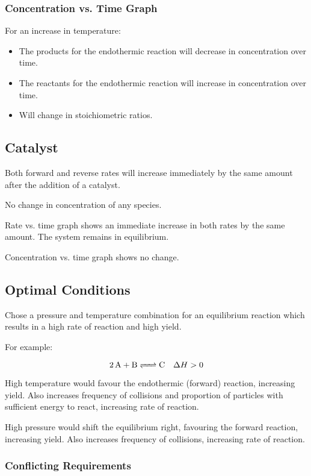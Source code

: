 \documentclass[a4paper,11pt]{article}
\begin{document}
\subsubsection{Concentration vs. Time Graph}

For an increase in temperature:

\begin{itemize}
\item The products for the endothermic reaction will decrease in concentration
	over time.
\item The reactants for the endothermic reaction will increase in concentration
	over time.
\item Will change in stoichiometric ratios.
\end{itemize}


\subsection{Catalyst}

Both forward and reverse rates will increase immediately by the same amount
after the addition of a catalyst.

No change in concentration of any species.

Rate vs. time graph shows an immediate increase in both rates by the same
amount. The system remains in equilibrium.

Concentration vs. time graph shows no change.


\subsection{Optimal Conditions}

Chose a pressure and temperature combination for an equilibrium reaction which
results in a high rate of reaction and high yield.

For example:

$$
\ce{2A + B <=> C} \quad \Delta H > 0
$$

High temperature would favour the endothermic (forward) reaction, increasing
yield. Also increases frequency of collisions and proportion of particles with
sufficient energy to react, increasing rate of reaction.

High pressure would shift the equilibrium right, favouring the forward
reaction, increasing yield. Also increases frequency of collisions, increasing
rate of reaction.


\subsubsection{Conflicting Requirements}
\end{document}
